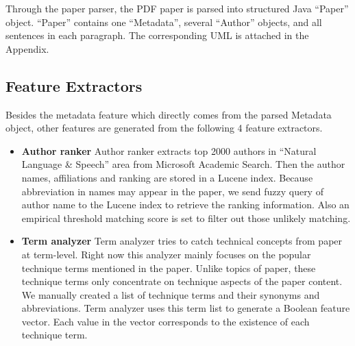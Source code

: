 \documentclass[11pt,letterpaper]{article}
\begin{document}
Through the paper parser, the PDF paper is parsed into structured Java ``Paper'' object. ``Paper'' contains one ``Metadata'', several ``Author'' objects, and all sentences in each paragraph. The corresponding UML is attached in the Appendix.


\subsection{Feature Extractors}
Besides the metadata feature which directly comes from the parsed Metadata object, other features are generated from the following 4 feature extractors. 

\begin{itemize} 
\item {\bf Author ranker}
Author ranker extracts top 2000 authors in ``Natural Language \& Speech'' area from Microsoft Academic Search. Then the author names, affiliations and ranking are stored in a Lucene  index. Because abbreviation in names may appear in the paper, we send fuzzy query of author name to the Lucene index to retrieve the ranking information. Also an empirical threshold matching score is set to filter out those unlikely matching. 


\item {\bf Term analyzer}
Term analyzer tries to catch technical concepts from paper at term-level. Right now this analyzer mainly focuses on the popular technique terms mentioned in the paper. Unlike topics of paper, these technique terms only concentrate on technique aspects of the paper content. We manually created a list of technique terms and their synonyms and abbreviations. Term analyzer uses this term list to generate a Boolean feature vector. Each value in the vector corresponds to the existence of each technique term.


\end{itemize}
\end{document}

